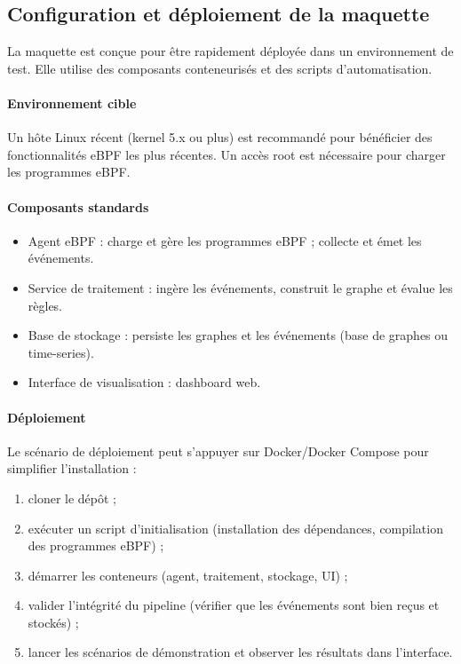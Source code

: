 \documentclass[a4paper,12pt]{article}
\begin{document}
\subsection{Configuration et déploiement de la maquette}

La maquette est conçue pour être rapidement déployée dans un environnement de test. Elle utilise des composants conteneurisés et des scripts d'automatisation.

\paragraph{Environnement cible}

Un hôte Linux récent (kernel 5.x ou plus) est recommandé pour bénéficier des fonctionnalités eBPF les plus récentes. Un accès root est nécessaire pour charger les programmes eBPF.

\paragraph{Composants standards}

\begin{itemize}
  \item Agent eBPF : charge et gère les programmes eBPF ; collecte et émet les événements.
  \item Service de traitement : ingère les événements, construit le graphe et évalue les règles.
  \item Base de stockage : persiste les graphes et les événements (base de graphes ou time-series).
  \item Interface de visualisation : dashboard web.
\end{itemize}

\paragraph{Déploiement}

Le scénario de déploiement peut s'appuyer sur Docker/Docker Compose pour simplifier l'installation :

\begin{enumerate}
  \item cloner le dépôt ;
  \item exécuter un script d'initialisation (installation des dépendances, compilation des programmes eBPF) ;
  \item démarrer les conteneurs (agent, traitement, stockage, UI) ;
  \item valider l'intégrité du pipeline (vérifier que les événements sont bien reçus et stockés) ;
  \item lancer les scénarios de démonstration et observer les résultats dans l'interface.
\end{enumerate}
\end{document}
